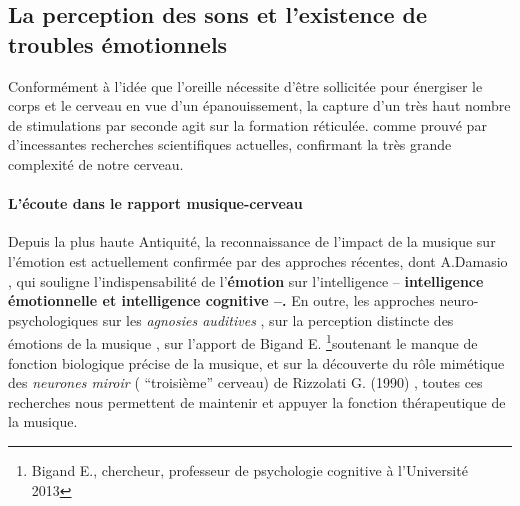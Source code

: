 \subsection{La perception des sons et l'existence de troubles
  émotionnels}


Conformément à l'idée que l'oreille nécessite d'être sollicitée pour
énergiser le corps et le cerveau en vue d'un épanouissement, la
capture d'un très haut nombre de stimulations par seconde agit
sur la formation \gls{réticulée}.
comme prouvé par d'incessantes recherches scientifiques actuelles,
confirmant la très grande complexité de notre cerveau.






                

\paragraph{ L'écoute dans le rapport
  musique-cerveau}

Depuis la plus haute Antiquité,  la reconnaissance de
l'impact de la musique sur l'émotion est actuellement confirmée par
des approches récentes, dont A.Damasio  \autocite {damasio:lautre},
qui souligne l'indispensabilité de l'\textbf{émotion}
sur l'intelligence --  \textbf{intelligence émotionnelle et intelligence
cognitive --.}
En outre, les approches neuro-psychologiques sur les \textit{agnosies
  auditives} \autocite[ pp. 205--216]{seron.baron.ea:neuropsychologie},
sur la perception distincte des émotions de la musique
\autocite[pp. 223--224]{platel_neuropsychology_2002}, 
sur l'apport de Bigand E. \autocite[Ch. 3
p. 35, "Vous avez l'oreille musicale"]{bigand:cerveau} \footnote {Bigand E., chercheur, professeur 
de psychologie cognitive à l'Université 2013 }soutenant le
manque de fonction biologique précise de la musique,
et sur la
découverte du rôle mimétique des\textit{ neurones miroir }( ``troisième''
cerveau) de Rizzolati G. (1990)
\autocite[118--119]{van_eersel_cerveau}, 
toutes ces recherches nous permettent de maintenir et
appuyer 
la fonction thérapeutique de la musique.









